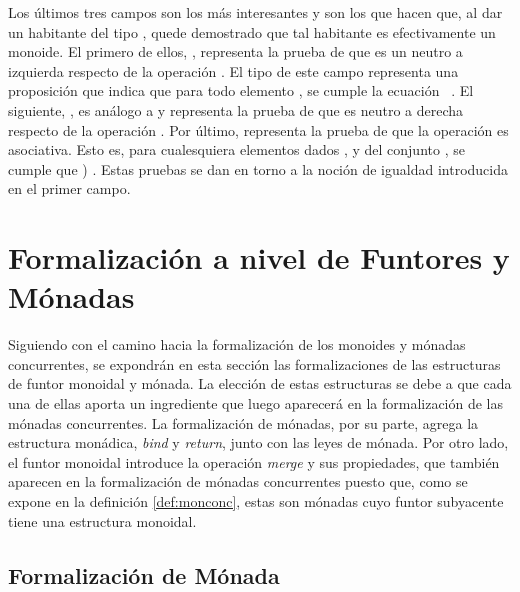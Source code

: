 Los últimos tres campos son los más interesantes y son los que hacen que, al dar un habitante del tipo , quede demostrado que tal habitante es efectivamente un monoide. El primero de ellos, , representa la prueba de que  es un neutro a izquierda respecto de la operación . El tipo de este campo representa una proposición que indica que para todo elemento , se cumple la ecuación \hbox{\AgdaSymbol{(}  \AgdaSymbol{)}  }. El siguiente, , es análogo a  y representa la prueba de que  es neutro a derecha respecto de la operación . Por último,  representa la prueba de que la operación  es asociativa. Esto es, para cualesquiera elementos dados ,  y  del conjunto , se cumple que \AgdaSymbol{(}  \AgdaSymbol{(}  \AgdaSymbol{))}  \AgdaSymbol{((}  \AgdaSymbol)  \AgdaSymbol{)}. Estas pruebas se dan en torno a la noción de igualdad introducida en el primer campo.

\section{Formalización a nivel de Funtores y Mónadas}\label{form:funtmon}

Siguiendo con el camino hacia la formalización de los monoides y mónadas concurrentes, se expondrán en esta sección las formalizaciones de las estructuras de funtor monoidal y mónada. La elección de estas estructuras se debe a que cada una de ellas aporta un ingrediente que luego aparecerá en la formalización de las mónadas concurrentes. La formalización de mónadas, por su parte, agrega la estructura monádica, \textit{bind} y \textit{return}, junto con las leyes de mónada. Por otro lado, el funtor monoidal introduce la operación \textit{merge} y sus propiedades, que también aparecen en la formalización de mónadas concurrentes puesto que, como se expone en la definición \ref{def:monconc}, estas son mónadas cuyo funtor subyacente tiene una estructura monoidal.

\subsection{Formalización de Mónada}\label{funtmon:mon}

